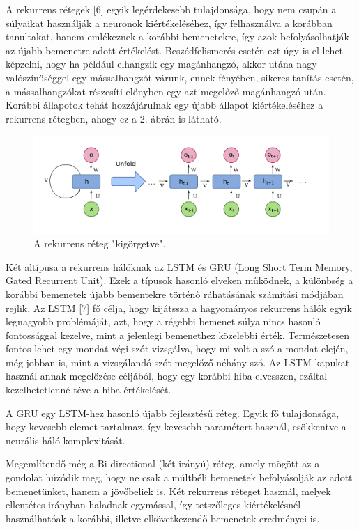 A rekurrens rétegek [6] egyik legérdekesebb tulajdonsága, hogy nem csupán a súlyaikat használják a neuronok kiértékeléséhez, így felhasználva a korábban tanultakat, hanem emlékeznek a korábbi bemenetekre, így azok befolyásolhatják az újabb bemenetre adott értékelést. Beszédfelismerés esetén ezt úgy is el lehet képzelni, hogy ha például elhangzik egy magánhangzó, akkor utána nagy valószínűséggel egy mássalhangzót várunk, ennek fényében, sikeres tanítás esetén, a mássalhangzókat részesíti előnyben egy azt megelőző magánhangzó után. Korábbi állapotok tehát hozzájárulnak egy újabb állapot kiértékeléséhez a rekurrens rétegben, ahogy ez a 2. ábrán is látható.
 
\begin{figure}[!ht]
\centering
\includegraphics[width=150mm, keepaspectratio]{figures/rnn.png}
\caption{A rekurrens réteg "kigörgetve".}
\label{fig:TeXstudio}
\end{figure}


Két altípusa a rekurrens hálóknak az LSTM és GRU (Long Short Term Memory, Gated Recurrent Unit). Ezek a típusok hasonló elveken működnek, a különbség a korábbi bemenetek újabb bementekre történő ráhatásának számítási módjában rejlik. Az LSTM [7] fő célja, hogy kijátssza a hagyományos rekurrens hálók egyik legnagyobb problémáját, azt, hogy a régebbi bemenet súlya nincs hasonló fontossággal kezelve, mint a jelenlegi bemenethez közelebbi érték. Természetesen fontos lehet egy mondat végi szót vizsgálva, hogy mi volt a szó a mondat elején, még jobban is, mint a vizsgálandó szót megelőző néhány szó. Az LSTM kapukat használ annak megelőzése céljából, hogy egy korábbi hiba elvesszen, ezáltal kezelhetetlenné téve a hiba értékelését.

A GRU egy LSTM-hez hasonló újabb fejlesztésű réteg. Egyik fő tulajdonsága, hogy kevesebb elemet tartalmaz, így kevesebb paramétert használ, csökkentve a neurális háló komplexitását.

Megemlítendő még a Bi-directional (két irányú) réteg, amely mögött az a gondolat húzódik meg, hogy ne csak a múltbéli bemenetek befolyásolják az adott bemenetünket, hanem a jövőbeliek is. Két rekurrens réteget használ, melyek ellentétes irányban haladnak egymással, így tetszőleges kiértékelésnél használhatóak a korábbi, illetve elkövetkezendő bemenetek eredményei is.

